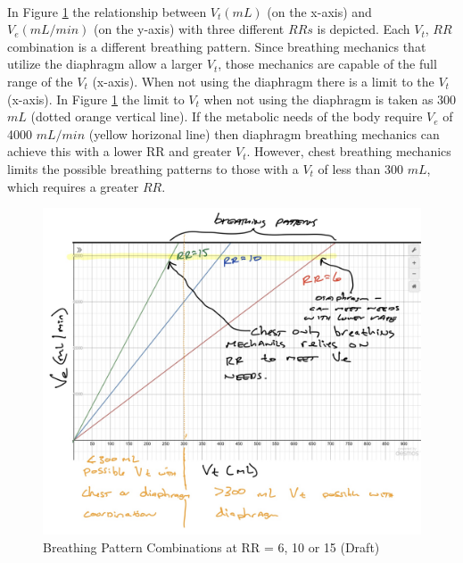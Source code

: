 \paragraph{} In Figure \ref{fig:breathing_patterns} the relationship between $V_t (mL)$ (on the x-axis) and $V_e (mL/min)$ (on the y-axis) with three different $RRs$ is depicted. Each $V_t$, $RR$ combination is a different breathing pattern. Since breathing mechanics that utilize the diaphragm allow a larger $V_t$, those mechanics are capable of the full range of the $V_t$ (x-axis). When not using the diaphragm there is a limit to the $V_t$ (x-axis). In Figure \ref{fig:breathing_patterns} the limit to $V_t$ when not using the diaphragm is taken as 300 $mL$ (dotted orange vertical line). If the metabolic needs of the body require $V_e$ of 4000 $mL/min$ (yellow horizonal line) then diaphragm breathing mechanics can achieve this with a lower RR and greater $V_t$. However, chest breathing mechanics limits the possible breathing patterns to those with a $V_t$ of less than 300 $mL$, which requires a greater $RR$.

\begin{figure}
    \centering
    \includegraphics[width=1.0 \linewidth]{./figure/ventilation/breathing_patterns.jpg}
    \caption{Breathing Pattern Combinations at RR = 6, 10 or 15 (Draft)}
    \label{fig:breathing_patterns}
\end{figure}

